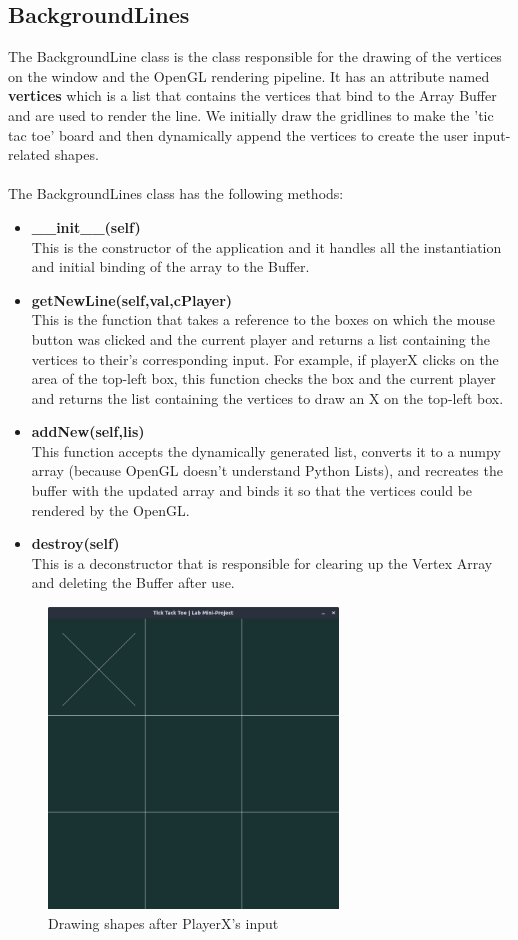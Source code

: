 \documentclass[12pt]{article}
\begin{document}
\subsection{BackgroundLines}
The BackgroundLine class is the class responsible for the drawing of the vertices on the window and the OpenGL rendering pipeline. It has an attribute named \textbf{vertices} which is a list that contains the vertices that bind to the Array Buffer and are used to render the line. We initially draw the gridlines to make the 'tic tac toe' board and
then dynamically append the vertices to create the user input-related shapes.
\\\\
The BackgroundLines class has the following methods:
\begin{itemize}
    \item \textbf{\_\_init\_\_(self)}\\ This is the constructor of the application and it handles all the instantiation and initial binding of the array to the Buffer.
    \item \textbf{getNewLine(self,val,cPlayer)}\\ This is the function that takes a reference to the boxes on which the mouse button was clicked and the current player and returns a list containing the vertices to their's corresponding input. For example, if playerX clicks on the area of the top-left box, this function checks the box and the current player and returns the list containing the vertices to draw an X on the top-left box.
    \item \textbf{addNew(self,lis)}\\This function accepts the dynamically generated list, converts it to a numpy array (because OpenGL doesn't understand Python Lists), and recreates the buffer with the updated array and binds it so that the vertices could be rendered by the OpenGL.
    \item \textbf{destroy(self)}\\ This is a deconstructor that is responsible for clearing up the Vertex Array and deleting the Buffer after use.
\end{itemize}
\begin{figure}[h]
    \centerline{\includegraphics[height=80mm]{userInput.png}}
    \caption{Drawing shapes after PlayerX's input}
    \label{fig}
\end{figure}
\end{document}
